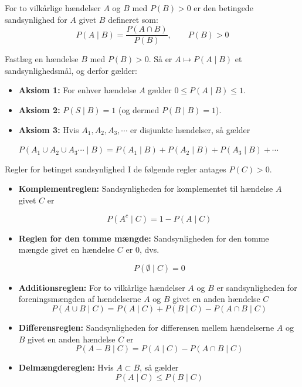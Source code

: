 \begin{definition}
For to vilkårlige hændelser \( A \) og \( B \) med \( P(B) > 0 \) er den betingede sandsynlighed for \( A \) givet \( B \) defineret som:
\[
P(A \mid B) = \frac{P(A \cap B)}{P(B)}, \qquad P(B) > 0
\]
\end{definition}

\begin{axiom}
    Fastlæg en hændelse $B$ med $P(B)>0$. Så er $A\mapsto P(A\mid B)$ et sandsynlighedsmål, og derfor gælder:
    \begin{itemize}
        \item \textbf{Aksiom 1:} For enhver hændelse \(A\) gælder \( 0 \leq P(A\mid B) \leq 1 \).
        \item \textbf{Aksiom 2:} $P(S\mid B)=1$ (og dermed $P(B\mid B)=1$).
        \item \textbf{Aksiom 3:} Hvis \(A_1, A_2, A_3, \cdots\) er disjunkte hændelser, så gælder
         
        \hspace*{2.8em}$P\left(A_1 \cup A_2 \cup A_3 \cdots \mid B\right)=P\left(A_1 \mid B\right)+P\left(A_2 \mid B\right)+P\left(A_3 \mid B\right)+\cdots$
    \end{itemize}
\end{axiom}

\begin{theorem}{Regler for betinget sandsynlighed}
    I de følgende regler antages $P(C)>0$.
    \begin{itemize}
        \item \textbf{Komplementreglen:} Sandsynligheden for komplementet til hændelse $A$ givet $C$ er
    
        \[
        P\left(A^c \mid C\right)=1-P(A \mid C)
        \]

        \item \textbf{Reglen for den tomme mængde:} Sandsynligheden for den tomme mængde givet en hændelse $C$ er 0, dvs.
        
        \[P(\emptyset \mid C) = 0\]
        
        \item \textbf{Additionsreglen:} For to vilkårlige hændelser $A$ og $B$ er sandsynligheden for foreningsmængden af hændelserne $A$ og $B$ givet en anden hændelse $C$
        \[
        P(A \cup B \mid C)=P(A \mid C)+P(B \mid C)-P(A \cap B \mid C)
        \]

        \item \textbf{Differensreglen:} Sandsynligheden for differensen mellem hændelserne $A$ og $B$ givet en anden hændelse $C$ er
        \[
            P(A-B \mid C)=P(A \mid C)-P(A \cap B \mid C)
        \]
        \item \textbf{Delmængdereglen:} Hvis $A \subset B$, så gælder
        \[
        P(A \mid C) \leq P(B \mid C)
        \]
    \end{itemize}
\end{theorem}

